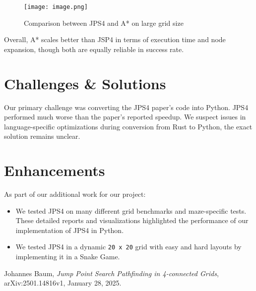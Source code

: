 \documentclass[11pt]{article}
\begin{document}
\begin{figure}[h!]
    \centering
    \texttt{[image: image.png]}
    \caption{Comparison between JPS4 and A* on large grid size}
    \label{fig:enter-label}
\end{figure}

\FloatBarrier

Overall, A* scales better than JSP4 in terms of execution time and node expansion, though both are equally reliable in success rate.

\section{Challenges \& Solutions}

Our primary challenge was converting the JPS4 paper's code into Python. JPS4 performed much worse than the paper's reported speedup. We suspect issues in language-specific optimizations during conversion from Rust to Python, the exact solution remains unclear.

\section{Enhancements}

As part of our additional work for our project:

\begin{itemize}
    \item We tested JPS4 on many different grid benchmarks and maze-specific tests. These detailed reports and visualizations highlighted the performance of our implementation of JPS4 in Python.
    \item We tested JPS4 in a dynamic \texttt{20 x 20} grid with easy and hard layouts by implementing it in a Snake Game.
\end{itemize}

\begin{thebibliography}{9}
Johannes Baum, \emph{Jump Point Search Pathfinding in 4-connected Grids}, arXiv:2501.14816v1, January 28, 2025.

\end{thebibliography}
\end{document}
